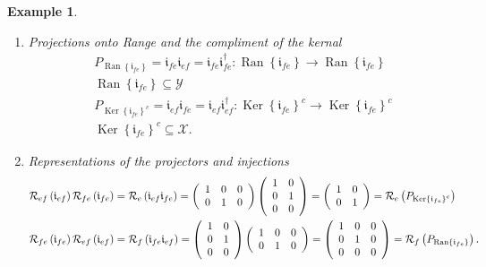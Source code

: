 \documentclass[aps,preprint]{revtex4}%
\newtheorem{example}[theorem]{Example}
\begin{document}
\begin{example}
\begin{enumerate}
\begin{enumerate}
\item Projections onto Range and the compliment of the kernal
\begin{gather}
P_{\operatorname{Ran}\left\{  \mathfrak{i}_{fe}\right\}  }=\mathfrak{i}%
_{fe}\mathfrak{i}_{ef}=\mathfrak{i}_{fe}\mathfrak{i}_{fe}^{\dagger
}:\operatorname{Ran}\left\{  \mathfrak{i}_{fe}\right\}  \rightarrow
\operatorname{Ran}\left\{  \mathfrak{i}_{fe}\right\} \\
\operatorname{Ran}\left\{  \mathfrak{i}_{fe}\right\}  \subseteq\mathcal{Y}\\
P_{\operatorname{Ker}\left\{  \mathfrak{i}_{fe}\right\}  ^{c}}=\mathfrak{i}%
_{ef}\mathfrak{i}_{fe}=\mathfrak{i}_{ef}\mathfrak{i}_{ef}^{\dagger
}:\operatorname{Ker}\left\{  \mathfrak{i}_{fe}\right\}  ^{c}\rightarrow
\operatorname{Ker}\left\{  \mathfrak{i}_{fe}\right\}  ^{c}\\
\operatorname{Ker}\left\{  \mathfrak{i}_{fe}\right\}  ^{c}\subseteq
\mathcal{X}.
\end{gather}


\item Representations of the projectors and injections
\begin{align}
\mathcal{R}_{ef}\left(  \mathfrak{i}_{ef}\right)  \mathcal{R}_{fe}\left(
\mathfrak{i}_{fe}\right)   &  =\mathcal{R}_{e}\left(  \mathfrak{i}%
_{ef}\mathfrak{i}_{fe}\right)  =\left(
\begin{array}
[c]{ccc}%
1 & 0 & 0\\
0 & 1 & 0
\end{array}
\right)  \left(
\begin{array}
[c]{cc}%
1 & 0\\
0 & 1\\
0 & 0
\end{array}
\right)  =\left(
\begin{array}
[c]{cc}%
1 & 0\\
0 & 1
\end{array}
\right)  =\mathcal{R}_{e}\left(  P_{\operatorname{Ker}\left\{  \mathfrak{i}%
_{fe}\right\}  ^{c}}\right) \\
\mathcal{R}_{fe}\left(  \mathfrak{i}_{fe}\right)  \mathcal{R}_{ef}\left(
\mathfrak{i}_{ef}\right)   &  =\mathcal{R}_{f}\left(  \mathfrak{i}%
_{fe}\mathfrak{i}_{ef}\right)  =\left(
\begin{array}
[c]{cc}%
1 & 0\\
0 & 1\\
0 & 0
\end{array}
\right)  \left(
\begin{array}
[c]{ccc}%
1 & 0 & 0\\
0 & 1 & 0
\end{array}
\right)  =\left(
\begin{array}
[c]{ccc}%
1 & 0 & 0\\
0 & 1 & 0\\
0 & 0 & 0
\end{array}
\right)  =\mathcal{R}_{f}\left(  P_{\operatorname{Ran}\left\{  \mathfrak{i}%
_{fe}\right\}  }\right)  .
\end{align}



\end{enumerate}
\end{enumerate}
\end{example}
\end{document}
